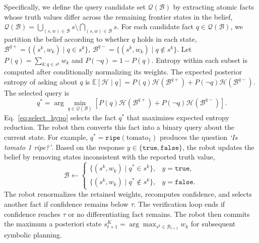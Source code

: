 Specifically, we define the query candidate set $\mathcal{Q}(\mathcal{B})$ by extracting atomic facts whose truth values differ across the remaining frontier states in the belief,
$\mathcal{Q}(\mathcal{B}) = \bigcup_{(s,w)\in\mathcal{B}}s \setminus \bigcap_{(s,w)\in\mathcal{B}}s.$
For each candidate fact $q\in\mathcal{Q}(\mathcal{B})$, we partition the belief according to whether $q$ holds in each state,
$\mathcal{B}^{q+}=\{(s^k,w_k)\mid q\in s^k\}$, $\mathcal{B}^{q-}=\{(s^k,w_k)\mid q\notin s^k\}.$
Let $P(q)=\sum_{k:q\in s^k}w_k$ and $P(\neg q)=1-P(q)$. Entropy within each subset is computed after conditionally normalizing its weights. The expected posterior entropy of asking about $q$ is
$\mathbb{E}[\mathcal{H}\mid q] = P(q)\mathcal{H}(\mathcal{B}^{q+}) + P(\neg q)\mathcal{H}(\mathcal{B}^{q-}).$
The selected query is
\begin{equation}~\label{eq:select_hypo}
q^* = \arg\min_{q\in\mathcal{Q}(\mathcal{B})} \left[P(q)\mathcal{H}(\mathcal{B}^{q+})+P(\neg q)\mathcal{H}(\mathcal{B}^{q-})\right].
\end{equation}
Eq.~\eqref{eq:select_hypo} selects the fact $q^*$ that maximizes expected entropy reduction. The robot then converts this fact into a binary query about the current state. For example, $q^*=\texttt{ripe}(\text{tomato}_1)$ produces the question \textit{`Is tomato 1 ripe?'}. Based on the response $y\in\{\texttt{true},\texttt{false}\}$, the robot updates the belief by removing states inconsistent with the reported truth value,
\begin{equation}
\mathcal{B}
\leftarrow
\begin{cases}
\{(s^k,w_k)\mid q^*\in s^k\}, & y=\texttt{true},\\
\{(s^k,w_k)\mid q^*\notin s^k\}, & y=\texttt{false}.
\end{cases}
\label{eq:filter}
\end{equation}
The robot renormalizes the retained weights, recomputes confidence, and selects another fact if confidence remains below $\tau$. The verification loop ends if confidence reaches $\tau$ or no differentiating fact remains. The robot then commits the maximum a posteriori state
$s_{t+1}^{K} = \arg\max_{s^k\in\mathcal{B}_{t+1}}w_k$
for subsequent symbolic planning. 

